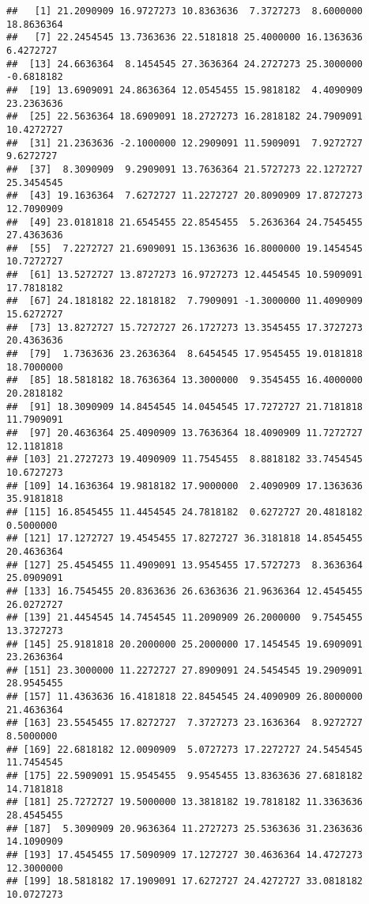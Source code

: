 \documentclass[]{book}
\begin{document}
\begin{verbatim}
##   [1] 21.2090909 16.9727273 10.8363636  7.3727273  8.6000000 18.8636364
##   [7] 22.2454545 13.7363636 22.5181818 25.4000000 16.1363636  6.4272727
##  [13] 24.6636364  8.1454545 27.3636364 24.2727273 25.3000000 -0.6818182
##  [19] 13.6909091 24.8636364 12.0545455 15.9818182  4.4090909 23.2363636
##  [25] 22.5636364 18.6909091 18.2727273 16.2818182 24.7909091 10.4272727
##  [31] 21.2363636 -2.1000000 12.2909091 11.5909091  7.9272727  9.6272727
##  [37]  8.3090909  9.2909091 13.7636364 21.5727273 22.1272727 25.3454545
##  [43] 19.1636364  7.6272727 11.2272727 20.8090909 17.8727273 12.7090909
##  [49] 23.0181818 21.6545455 22.8545455  5.2636364 24.7545455 27.4363636
##  [55]  7.2272727 21.6909091 15.1363636 16.8000000 19.1454545 10.7272727
##  [61] 13.5272727 13.8727273 16.9727273 12.4454545 10.5909091 17.7818182
##  [67] 24.1818182 22.1818182  7.7909091 -1.3000000 11.4090909 15.6272727
##  [73] 13.8272727 15.7272727 26.1727273 13.3545455 17.3727273 20.4363636
##  [79]  1.7363636 23.2636364  8.6454545 17.9545455 19.0181818 18.7000000
##  [85] 18.5818182 18.7636364 13.3000000  9.3545455 16.4000000 20.2818182
##  [91] 18.3090909 14.8454545 14.0454545 17.7272727 21.7181818 11.7909091
##  [97] 20.4636364 25.4090909 13.7636364 18.4090909 11.7272727 12.1181818
## [103] 21.2727273 19.4090909 11.7545455  8.8818182 33.7454545 10.6727273
## [109] 14.1636364 19.9818182 17.9000000  2.4090909 17.1363636 35.9181818
## [115] 16.8545455 11.4454545 24.7818182  0.6272727 20.4818182  0.5000000
## [121] 17.1272727 19.4545455 17.8272727 36.3181818 14.8545455 20.4636364
## [127] 25.4545455 11.4909091 13.9545455 17.5727273  8.3636364 25.0909091
## [133] 16.7545455 20.8363636 26.6363636 21.9636364 12.4545455 26.0272727
## [139] 21.4454545 14.7454545 11.2090909 26.2000000  9.7545455 13.3727273
## [145] 25.9181818 20.2000000 25.2000000 17.1454545 19.6909091 23.2636364
## [151] 23.3000000 11.2272727 27.8909091 24.5454545 19.2909091 28.9545455
## [157] 11.4363636 16.4181818 22.8454545 24.4090909 26.8000000 21.4636364
## [163] 23.5545455 17.8272727  7.3727273 23.1636364  8.9272727  8.5000000
## [169] 22.6818182 12.0090909  5.0727273 17.2272727 24.5454545 11.7454545
## [175] 22.5909091 15.9545455  9.9545455 13.8363636 27.6818182 14.7181818
## [181] 25.7272727 19.5000000 13.3818182 19.7818182 11.3363636 28.4545455
## [187]  5.3090909 20.9636364 11.2727273 25.5363636 31.2363636 14.1090909
## [193] 17.4545455 17.5090909 17.1272727 30.4636364 14.4727273 12.3000000
## [199] 18.5818182 17.1909091 17.6272727 24.4272727 33.0818182 10.0727273

\end{verbatim}
\end{document}
